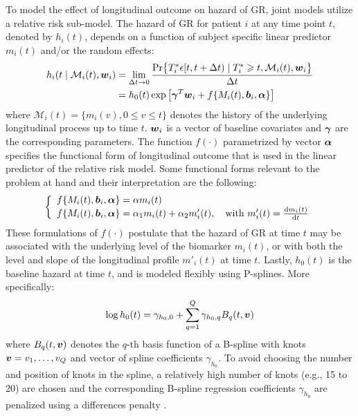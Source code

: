 To model the effect of longitudinal outcome on hazard of GR, joint models utilize a relative risk sub-model. The hazard of GR for patient $i$ at any time point $t$, denoted by $h_i(t)$, depends on a function of subject specific linear predictor $m_i(t)$ and/or the random effects:
\begin{align*}
h_i(t \mid \mathcal{M}_i(t), \boldsymbol{w}_i) &= \lim_{\Delta t \to 0} \frac{\mbox{Pr}\big\{T^*_i \epsilon [t, t + \Delta t) \mid T^*_i \geqslant t, \mathcal{M}_i(t), \boldsymbol{w}_i\big\}}{\Delta t}\\
&=h_0(t) \exp\big[\boldsymbol{\gamma}^T\boldsymbol{w}_i + f\{M_i(t), \boldsymbol{b}_i, \boldsymbol{\alpha}\}\big]
\end{align*}
where $\mathcal{M}_i(t) = \{m_i(v), 0\leq v \leq t\}$ denotes the history of the underlying longitudinal process up to time $t$. $\boldsymbol{w}_i$ is a vector of baseline covariates and $\boldsymbol{\gamma}$ are the corresponding parameters. The function $f(\cdot)$ parametrized by vector $\boldsymbol{\alpha}$ specifies the functional form of longitudinal outcome \citep{brown2009assessing,rizopoulos2012joint,taylor2013real,rizopoulos2014bma} that is used in the linear predictor of the relative risk model. Some functional forms relevant to the problem at hand and their interpretation are the following: 
\begin{eqnarray*}
\left \{
\begin{array}{l}
f\{M_i(t), \boldsymbol{b}_i, \boldsymbol{\alpha}\} = \alpha m_i(t)\\
f\{M_i(t), \boldsymbol{b}_i, \boldsymbol{\alpha}\} = \alpha_1 m_i(t) + \alpha_2 m'_i(t),\quad \text{with}\  m'_i(t) = \frac{\mathrm{d}{m_i(t)}}{\mathrm{d}{t}}\\
\end{array}
\right.
\end{eqnarray*}
These formulations of $f(\cdot)$ postulate that the hazard of GR at time $t$ may be associated with the underlying level of the biomarker $m_i(t)$, or with both the level and slope of the longitudinal profile $m'_i(t)$ at time $t$. Lastly, $h_0(t)$ is the baseline hazard at time $t$, and is modeled flexibly using P-splines. More specifically:
\begin{equation*}
\log{h_0(t)} = \gamma_{h_0,0} + \sum_{q=1}^Q \gamma_{h_0,q} B_q(t, \boldsymbol{v})
\end{equation*}
where $B_q(t, \boldsymbol{v})$ denotes the $q$-th basis function of a B-spline with knots $\boldsymbol{v} = v_1, \ldots, v_Q$ and vector of spline coefficients $\gamma_{h_0}$. To avoid choosing the number and position of knots in the spline, a relatively high number of knots (e.g., 15 to 20) are chosen and the corresponding B-spline regression coefficients $\gamma_{h_0}$ are penalized using a differences penalty \citep{eilers1996flexible}. 

